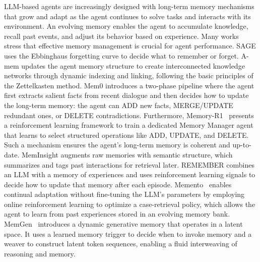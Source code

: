 LLM-based agents are increasingly designed with long-term memory mechanisms that grow and adapt as the agent continues to solve tasks and interacts with its environment\citep{shan2025cognitive, qian2023experiential}. An evolving memory enables the agent to accumulate knowledge, recall past events, and adjust its behavior based on experience. Many works stress that effective memory management is crucial for agent performance\citep{zhong2024memorybank, zhang2025g, yan2024efficient}. SAGE\citep{liang2024sage} uses the Ebbinghaus forgetting curve to decide what to remember or forget. A-mem\citep{xu2025mem} updates the agent memory structure to create interconnected knowledge networks through dynamic indexing and linking, following the basic principles of the Zettelkasten method. Mem0\citep{chhikara2025mem0} introduces a two-phase pipeline where the agent first extracts salient facts from recent dialogue and then decides how to update the long-term memory: the agent can ADD new facts, MERGE/UPDATE redundant ones, or DELETE contradictions. Furthermore, Memory-R1~\citep{yan2025memoryr1} presents a reinforcement learning framework to train a dedicated Memory Manager agent that learns to select structured operations like ADD, UPDATE, and DELETE.
Such a mechanism ensures the agent's long-term memory is coherent and up-to-date. MemInsight\citep{salama2025meminsight} augments raw memories with semantic structure, which summarizes and tags past interactions for retrieval later. REMEMBER\citep{zhang2024large} combines an LLM with a memory of experiences and uses reinforcement learning signals to decide how to update that memory after each episode. 
Memento~\citep{zhou2025memento} enables continual adaptation without fine-tuning the LLM's parameters by employing online reinforcement learning to optimize a case-retrieval policy, which allows the agent to learn from past experiences stored in an evolving memory bank. MemGen~\citep{zhang2025memgen} introduces a dynamic generative memory that operates in a latent space. It uses a learned memory trigger to decide when to invoke memory and a weaver to construct latent token sequences, enabling a fluid interweaving of reasoning and memory.


